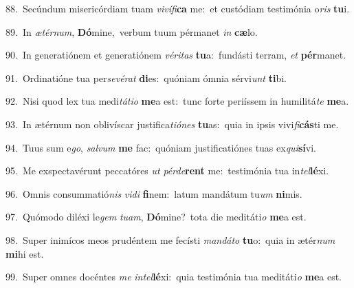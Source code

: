{\numbfont\textcolor{\numbcolor}{88.}}~Secúndum misericórdiam tuam \textit{vi}\-\textit{ví}\textit{fi}\textbf{ca} me:~\star et custódiam testimónia o\textit{ris} \textbf{tu}\-i.\par
{\numbfont\textcolor{\numbcolor}{89.}}~In \textit{æ}\-\textit{tér}\textit{num}, \textbf{Dó}\-mine,~\star verbum tuum pérmanet \textit{in} \textbf{cæ}\-lo.\par
{\numbfont\textcolor{\numbcolor}{90.}}~In generatiónem et generatiónem \textit{vé}\-\textit{ri}\textit{tas} \textbf{tu}\-a:~\star fundásti terram, \textit{et} \textbf{pér}\-manet.\par
{\numbfont\textcolor{\numbcolor}{91.}}~Ordinatióne tua per\-\textit{se}\-\textit{vé}\textit{rat} \textbf{di}\-es:~\star quóniam ómnia sérvi\textit{unt} \textbf{ti}\-bi.\par
{\numbfont\textcolor{\numbcolor}{92.}}~Nisi quod lex tua medi\-\textit{tá}\-\textit{ti}\textit{o} \textbf{me}\-a est:~\star tunc forte periíssem in humilitá\textit{te} \textbf{me}\-a.\par
{\numbfont\textcolor{\numbcolor}{93.}}~In ætérnum non oblivíscar justifica\-\textit{ti}\-\textit{ó}\textit{nes} \textbf{tu}\-as:~\star quia in ipsis vivi\-\textit{fi}\-\textbf{cás}ti me.\par
{\numbfont\textcolor{\numbcolor}{94.}}~Tuus sum e\-\textit{go}\-, \textit{sal}\-\textit{vum} \textbf{me} fac:~\star quóniam justificatiónes tuas ex\-\textit{qui}\-\textbf{sí}vi.\par
{\numbfont\textcolor{\numbcolor}{95.}}~Me exspectavérunt peccatóres \textit{ut} \textit{pér}\-\textit{de}\textbf{rent} me:~\star testimónia tua in\-\textit{tel}\-\textbf{lé}xi.\par
{\numbfont\textcolor{\numbcolor}{96.}}~Omnis consummatió\textit{nis} \textit{vi}\-\textit{di} \textbf{fi}\-nem:~\star latum mandátum tu\textit{um} \textbf{ni}\-mis.\par
{\numbfont\textcolor{\numbcolor}{97.}}~Quómodo diléxi le\textit{gem} \textit{tu}\-\textit{am}, \textbf{Dó}\-mine?~\star tota die meditáti\textit{o} \textbf{me}\-a est.\par
{\numbfont\textcolor{\numbcolor}{98.}}~Super inimícos meos prudéntem me fecísti \textit{man}\-\textit{dá}\textit{to} \textbf{tu}\-o:~\star quia in ætér\textit{num} \textbf{mi}\-hi est.\par
{\numbfont\textcolor{\numbcolor}{99.}}~Super omnes docéntes \textit{me} \textit{in}\-\textit{tel}\textbf{lé}xi:~\star quia testimónia tua meditáti\textit{o} \textbf{me}\-a est.\par
